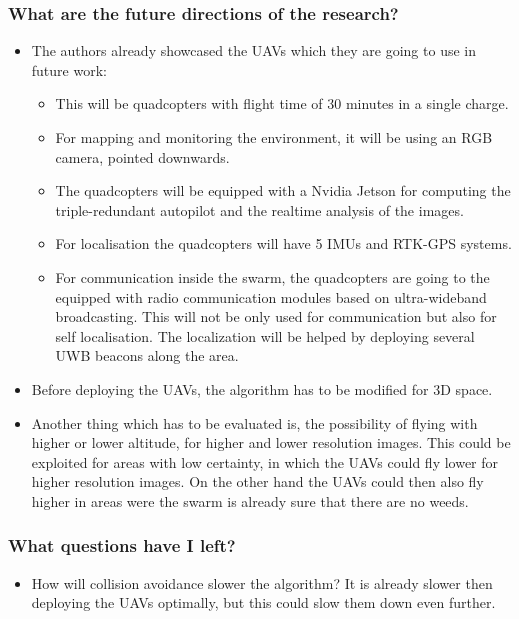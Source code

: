     \subsubsection*{What are the future directions of the research?}
    \begin{itemize}
        \item The authors already showcased the UAVs which they are going to use in future work: \ \begin{itemize}
            \item This will be quadcopters with flight time of 30 minutes in a single charge. 
            \item For mapping and monitoring the environment, it will be using an RGB camera, pointed downwards.
            \item The quadcopters will be equipped with a Nvidia Jetson for computing the triple-redundant autopilot and the realtime analysis of the images.
            \item For localisation the quadcopters will have 5 IMUs and RTK-GPS systems.
            \item For communication inside the swarm, the quadcopters are going to the equipped with radio communication modules based on ultra-wideband broadcasting. This will not be only used for communication but also for self localisation. The localization will be helped by deploying several UWB beacons along the area.
        \end{itemize}
        \item Before deploying the UAVs, the algorithm has to be modified for 3D space.
        \item Another thing which has to be evaluated is, the possibility of flying with higher or lower altitude, for higher and lower resolution images. This could be exploited for areas with low certainty, in which the UAVs could fly lower for higher resolution images. On the other hand the UAVs could then also fly higher in areas were the swarm is already sure that there are no weeds.
    \end{itemize}
    \subsubsection*{What questions have I left?}
    \begin{itemize}
        \item How will collision avoidance slower the algorithm? It is already slower then deploying the UAVs optimally, but this could slow them down even further.
    \end{itemize}
